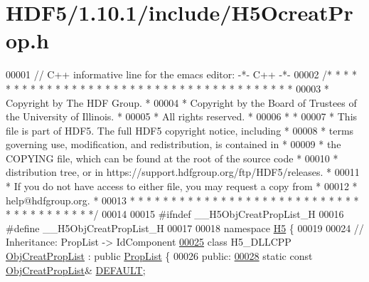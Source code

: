 \hypertarget{_h_d_f5_21_810_81_2include_2_h5_ocreat_prop_8h_source}{}\section{H\+D\+F5/1.10.1/include/\+H5\+Ocreat\+Prop.h}
\label{_h_d_f5_21_810_81_2include_2_h5_ocreat_prop_8h_source}

\begin{DoxyCode}
00001 \textcolor{comment}{// C++ informative line for the emacs editor: -*- C++ -*-}
00002 \textcolor{comment}{/* * * * * * * * * * * * * * * * * * * * * * * * * * * * * * * * * * * * * * *}
00003 \textcolor{comment}{ * Copyright by The HDF Group.                                               *}
00004 \textcolor{comment}{ * Copyright by the Board of Trustees of the University of Illinois.         *}
00005 \textcolor{comment}{ * All rights reserved.                                                      *}
00006 \textcolor{comment}{ *                                                                           *}
00007 \textcolor{comment}{ * This file is part of HDF5.  The full HDF5 copyright notice, including     *}
00008 \textcolor{comment}{ * terms governing use, modification, and redistribution, is contained in    *}
00009 \textcolor{comment}{ * the COPYING file, which can be found at the root of the source code       *}
00010 \textcolor{comment}{ * distribution tree, or in https://support.hdfgroup.org/ftp/HDF5/releases.  *}
00011 \textcolor{comment}{ * If you do not have access to either file, you may request a copy from     *}
00012 \textcolor{comment}{ * help@hdfgroup.org.                                                        *}
00013 \textcolor{comment}{ * * * * * * * * * * * * * * * * * * * * * * * * * * * * * * * * * * * * * * */}
00014 
00015 \textcolor{preprocessor}{#ifndef \_\_H5ObjCreatPropList\_H}
00016 \textcolor{preprocessor}{#define \_\_H5ObjCreatPropList\_H}
00017 
00018 \textcolor{keyword}{namespace }\hyperlink{namespace_h5}{H5} \{
00019 
00024 \textcolor{comment}{//  Inheritance: PropList -> IdComponent}
\hyperlink{class_h5_1_1_obj_creat_prop_list}{00025} \textcolor{keyword}{class }H5\_DLLCPP \hyperlink{class_h5_1_1_obj_creat_prop_list}{ObjCreatPropList} : \textcolor{keyword}{public} \hyperlink{class_h5_1_1_prop_list}{PropList} \{
00026    \textcolor{keyword}{public}:
\hyperlink{class_h5_1_1_obj_creat_prop_list_a786366fcea5bb716dc963074823d2d45}{00028}         \textcolor{keyword}{static} \textcolor{keyword}{const} \hyperlink{class_h5_1_1_obj_creat_prop_list}{ObjCreatPropList}& \hyperlink{class_h5_1_1_obj_creat_prop_list_a786366fcea5bb716dc963074823d2d45}{DEFAULT};

\end{DoxyCode}
